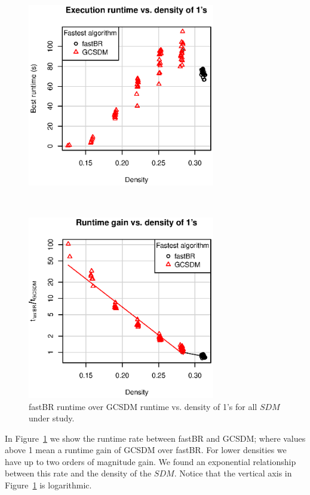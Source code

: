 \documentclass[authoryear,11pt]{elsarticle}
\begin{document}
	\begin{figure}[htb]
	\begin{minipage}{.48\textwidth}
	    \begin{center}
	       \includegraphics[height=8cm]{runtimeVSdensity_low.eps}
	    \end{center}
	\caption{Best performing algorithm runtime vs. density of 1's for all $SDM$ under study.}
	\label{fig:runtime_low}
	\end{minipage}%
	~
	\begin{minipage}{.48\textwidth}
	    \begin{center}
	       \includegraphics[height=8cm]{rate_runtime.eps}
	    \end{center}
	\caption{fastBR runtime over GCSDM runtime  vs. density of 1's for all $SDM$ under study.}
	\label{fig:BRvsGAP}
	\end{minipage}	
	\end{figure}	
	
	In Figure~\ref{fig:BRvsGAP} we show the runtime rate between fastBR and GCSDM; where values above
	1 mean a runtime gain of GCSDM over fastBR. For lower densities we have up to two orders of magnitude gain.
	We found an exponential relationship between this rate and the density of the $SDM$. Notice that the 
	vertical axis in Figure~\ref{fig:BRvsGAP} is logarithmic.
	
\end{document}
